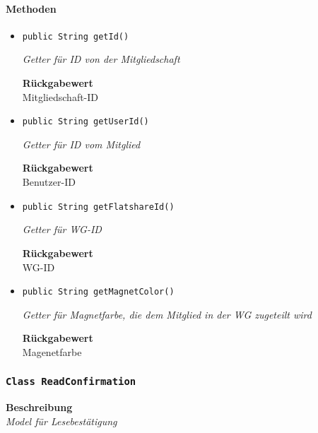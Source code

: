      \paragraph*{Methoden}
     \begin{itemize}
     	\item{\texttt{public String getId()}}
     	
     	\textit{Getter für ID von der Mitgliedschaft}
     	
     	
     	
     	\textbf{Rückgabewert} \\
     	Mitgliedschaft-ID        \item{\texttt{public String getUserId()}}
     	
     	\textit{Getter für ID vom Mitglied}
     	
     	
     	
     	\textbf{Rückgabewert} \\
     	Benutzer-ID        \item{\texttt{public String getFlatshareId()}}
     	
     	\textit{Getter für WG-ID}
     	
     	
     	
     	\textbf{Rückgabewert} \\
     	WG-ID        \item{\texttt{public String getMagnetColor()}}
     	
     	\textit{Getter für Magnetfarbe, die dem Mitglied in der WG zugeteilt wird}
     	
     	
     	
     	\textbf{Rückgabewert} \\
     	Magenetfarbe
     \end{itemize}
     \subsubsection{\texttt{Class ReadConfirmation}}
     \textbf{Beschreibung} \\
     \textit{Model für Lesebestätigung}
